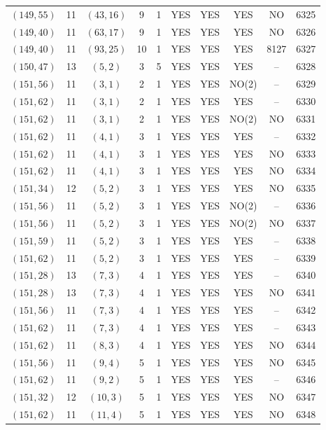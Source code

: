 \begin{longtable}{|c|c|c|c|c|c|c|c|c|c|}
$(149, 55)$ & 11 & $(43, 16)$ & 9 & 1 & YES & YES & YES & NO & 6325\\
$(149, 40)$ & 11 & $(63, 17)$ & 9 & 1 & YES & YES & YES & NO & 6326\\
$(149, 40)$ & 11 & $(93, 25)$ & 10 & 1 & YES & YES & YES & 8127 & 6327\\
$(150, 47)$ & 13 & $(5, 2)$ & 3 & 5 & YES & YES & YES & -- & 6328\\
$(151, 56)$ & 11 & $(3, 1)$ & 2 & 1 & YES & YES & NO(2) & -- & 6329\\
$(151, 62)$ & 11 & $(3, 1)$ & 2 & 1 & YES & YES & YES & -- & 6330\\
$(151, 62)$ & 11 & $(3, 1)$ & 2 & 1 & YES & YES & NO(2) & NO & 6331\\
$(151, 62)$ & 11 & $(4, 1)$ & 3 & 1 & YES & YES & YES & -- & 6332\\
$(151, 62)$ & 11 & $(4, 1)$ & 3 & 1 & YES & YES & YES & NO & 6333\\
$(151, 62)$ & 11 & $(4, 1)$ & 3 & 1 & YES & YES & YES & NO & 6334\\
$(151, 34)$ & 12 & $(5, 2)$ & 3 & 1 & YES & YES & YES & NO & 6335\\
$(151, 56)$ & 11 & $(5, 2)$ & 3 & 1 & YES & YES & NO(2) & -- & 6336\\
$(151, 56)$ & 11 & $(5, 2)$ & 3 & 1 & YES & YES & NO(2) & NO & 6337\\
$(151, 59)$ & 11 & $(5, 2)$ & 3 & 1 & YES & YES & YES & -- & 6338\\
$(151, 62)$ & 11 & $(5, 2)$ & 3 & 1 & YES & YES & YES & -- & 6339\\
$(151, 28)$ & 13 & $(7, 3)$ & 4 & 1 & YES & YES & YES & -- & 6340\\
$(151, 28)$ & 13 & $(7, 3)$ & 4 & 1 & YES & YES & YES & NO & 6341\\
$(151, 56)$ & 11 & $(7, 3)$ & 4 & 1 & YES & YES & YES & -- & 6342\\
$(151, 62)$ & 11 & $(7, 3)$ & 4 & 1 & YES & YES & YES & -- & 6343\\
$(151, 62)$ & 11 & $(8, 3)$ & 4 & 1 & YES & YES & YES & NO & 6344\\
$(151, 56)$ & 11 & $(9, 4)$ & 5 & 1 & YES & YES & YES & NO & 6345\\
$(151, 62)$ & 11 & $(9, 2)$ & 5 & 1 & YES & YES & YES & -- & 6346\\
$(151, 32)$ & 12 & $(10, 3)$ & 5 & 1 & YES & YES & YES & NO & 6347\\
$(151, 62)$ & 11 & $(11, 4)$ & 5 & 1 & YES & YES & YES & NO & 6348\\

\end{longtable}
